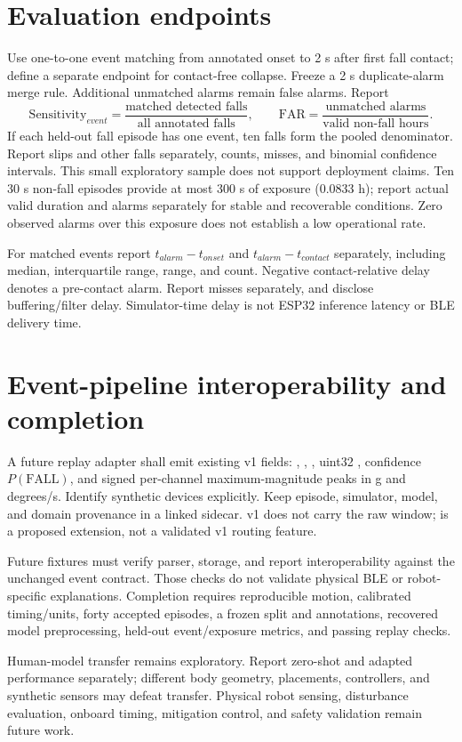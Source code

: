 \section{Evaluation endpoints}
Use one-to-one event matching from annotated onset to 2 s after first fall contact; define a separate endpoint for contact-free collapse. Freeze a 2 s duplicate-alarm merge rule. Additional unmatched alarms remain false alarms. Report
\[
\mathrm{Sensitivity}_{event}=\frac{\text{matched detected falls}}{\text{all annotated falls}},\qquad
\mathrm{FAR}=\frac{\text{unmatched alarms}}{\text{valid non-fall hours}}.
\]
If each held-out fall episode has one event, ten falls form the pooled denominator. Report slips and other falls separately, counts, misses, and binomial confidence intervals. This small exploratory sample does not support deployment claims. Ten 30 s non-fall episodes provide at most 300 s of exposure (0.0833 h); report actual valid duration and alarms separately for stable and recoverable conditions. Zero observed alarms over this exposure does not establish a low operational rate.

For matched events report $t_{alarm}-t_{onset}$ and $t_{alarm}-t_{contact}$ separately, including median, interquartile range, range, and count. Negative contact-relative delay denotes a pre-contact alarm. Report misses separately, and disclose buffering/filter delay. Simulator-time delay is not ESP32 inference latency or BLE delivery time.

\section{Event-pipeline interoperability and completion}
A future replay adapter shall emit existing v1 fields: , , , uint32 , confidence $P(\mathrm{FALL})$, and signed per-channel maximum-magnitude peaks in g and degrees/s. Identify synthetic devices explicitly. Keep episode, simulator, model, and domain provenance in a linked sidecar. v1 does not carry the raw window;  is a proposed extension, not a validated v1 routing feature.

Future fixtures must verify parser, storage, and report interoperability against the unchanged event contract. Those checks do not validate physical BLE or robot-specific explanations. Completion requires reproducible motion, calibrated timing/units, forty accepted episodes, a frozen split and annotations, recovered model preprocessing, held-out event/exposure metrics, and passing replay checks.

Human-model transfer remains exploratory. Report zero-shot and adapted performance separately; different body geometry, placements, controllers, and synthetic sensors may defeat transfer. Physical robot sensing, disturbance evaluation, onboard timing, mitigation control, and safety validation remain future work.
